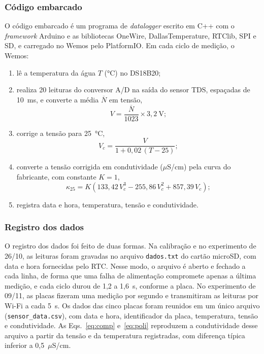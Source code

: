 \documentclass[12pt,a4paper]{article}
\providecommand{\uScm}{\ensuremath{\mu}S/cm}
\begin{document}
\subsubsection{Código embarcado}

O código embarcado é um programa de \emph{datalogger} escrito em C++ com o \emph{framework} Arduino e as bibliotecas OneWire, DallasTemperature, RTClib, SPI e SD, e carregado no Wemos pelo PlatformIO. Em cada ciclo de medição, o Wemos:
\begin{enumerate}
  \item lê a temperatura da água $T$ (°C) no DS18B20;
  \item realiza 20 leituras do conversor A/D na saída do sensor TDS, espaçadas de 10~ms, e converte a média $\overline{N}$ em tensão,
  \begin{equation}
    V = \frac{\overline{N}}{1023}\times 3{,}2~\mathrm{V};
    \label{eq:adc}
  \end{equation}
  \item corrige a tensão para 25~°C,
  \begin{equation}
    V_c = \frac{V}{1 + 0{,}02\,(T - 25)};
    \label{eq:comp}
  \end{equation}
  \item converte a tensão corrigida em condutividade (\uScm) pela curva do fabricante, com constante $K = 1$,
  \begin{equation}
    \kappa_{25} = K\left(133{,}42\,V_c^{3} - 255{,}86\,V_c^{2} + 857{,}39\,V_c\right);
    \label{eq:poli}
  \end{equation}
  \item registra data e hora, temperatura, tensão e condutividade.
\end{enumerate}

\subsubsection{Registro dos dados}

O registro dos dados foi feito de duas formas. Na calibração e no experimento de 26/10, as leituras foram gravadas no arquivo \texttt{dados.txt} do cartão microSD, com data e hora fornecidas pelo RTC. Nesse modo, o arquivo é aberto e fechado a cada linha, de forma que uma falha de alimentação compromete apenas a última medição, e cada ciclo durou de 1,2 a 1,6~s, conforme a placa. No experimento de 09/11, as placas fizeram uma medição por segundo e transmitiram as leituras por Wi-Fi a cada 5~s. Os dados das cinco placas foram reunidos em um único arquivo (\texttt{sensor\_data.csv}), com data e hora, identificador da placa, temperatura, tensão e condutividade. As Eqs.~\eqref{eq:comp} e~\eqref{eq:poli} reproduzem a condutividade desse arquivo a partir da tensão e da temperatura registradas, com diferença típica inferior a 0,5~\uScm.
\end{document}
